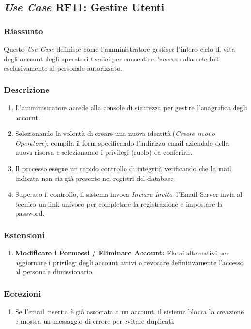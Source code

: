     \subsection*{\textit{Use Case} RF11: Gestire Utenti}
        \subsubsection*{Riassunto}
            Questo \textit{Use Case} definisce come l'amministratore gestisce l'intero ciclo di vita degli account degli operatori tecnici per consentire l'accesso alla rete IoT esclusivamente al personale autorizzato.
        \subsubsection*{Descrizione}
            \begin{enumerate}
                \item L'amministratore accede alla console di sicurezza per gestire l'anagrafica degli account.
                \item Selezionando la volontà di creare una nuova identità (\textit{Creare nuovo Operatore}), compila il form specificando l'indirizzo email aziendale della nuova risorsa e selezionando i privilegi (ruolo) da conferirle.
                \item Il processo esegue un rapido controllo di integrità verificando che la mail indicata non sia già presente nei registri del database.
                \item Superato il controllo, il sistema invoca \textit{Inviare Invito}: l'Email Server invia al tecnico un link univoco per completare la registrazione e impostare la password.
            \end{enumerate}
        \subsubsection*{Estensioni}
            \begin{enumerate}
                \item \textbf{Modificare i Permessi / Eliminare Account:} Flussi alternativi per aggiornare i privilegi degli account attivi o revocare definitivamente l'accesso al personale dimissionario.
            \end{enumerate}
        \subsubsection*{Eccezioni}
            \begin{enumerate}
                \item Se l'email inserita è già associata a un account, il sistema blocca la creazione e mostra un messaggio di errore per evitare duplicati.
            \end{enumerate}

